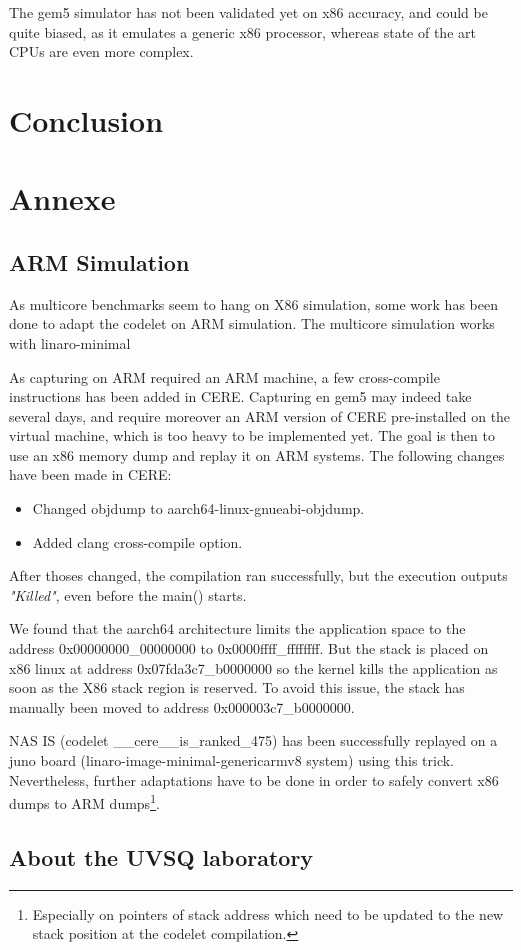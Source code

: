\documentclass{article}
\begin{document}
\begin{multicols}{2}
The gem5 simulator has not been validated yet on x86 accuracy, and could be quite biased, as it emulates a generic x86 processor, whereas state of the art CPUs are even more complex.


\section{Conclusion}
\label{ccl}

\newpage





\newpage
\section{Annexe}
\subsection{ARM Simulation}
\label{ARM_sim}
As multicore benchmarks seem to hang on X86 simulation, some work has been done to adapt the codelet on ARM simulation.
The multicore simulation works with linaro-minimal

As capturing on ARM required an ARM machine, a few cross-compile instructions has been added in CERE. Capturing en gem5 may indeed take several days, and require moreover an ARM version of CERE pre-installed on the virtual machine, which is too heavy to be implemented yet. The goal is then to use an x86 memory dump and replay it on ARM systems. The following changes have been made in CERE:
\begin{itemize}
\item Changed objdump to aarch64-linux-gnueabi-objdump.
\item Added clang cross-compile option.
\end{itemize}

After thoses changed, the compilation ran successfully, but the execution outputs \textit{"Killed"}, even before the main() starts.


We found that the aarch64 architecture limits the application space to the address 0x00000000\_00000000 to 0x0000ffff\_ffffffff\cite{aarch64-mmu}.
 But the stack is placed on x86 linux at address 0x07fda3c7\_b0000000 so the kernel kills the application as soon as the X86 stack region is reserved.
To avoid this issue, the stack has manually been moved to address 0x000003c7\_b0000000.

NAS IS (codelet \_\_cere\_\_is\_ranked\_475) has been successfully replayed on a juno board (linaro-image-minimal-genericarmv8 system) using this trick. Nevertheless, further adaptations have to be done in order to safely convert x86 dumps to ARM dumps\footnote{Especially on pointers of stack address which need to be updated to the new stack position at the codelet compilation.}.


\subsection{About the UVSQ laboratory}

\end{multicols}
\end{document}
